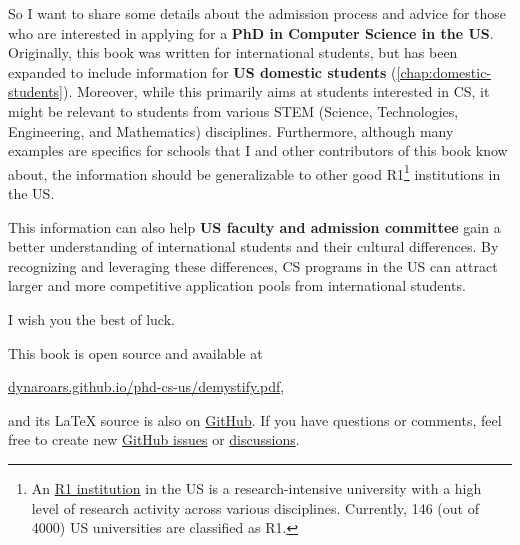 \documentclass[oneside,11pt,dvipsnames]{book}
\begin{document}
So I want to share some details about the admission process and advice for those who are interested in applying for a \textbf{PhD in Computer Science in the US}.
Originally, this book was written for international students, but has been expanded to include information for \textbf{US domestic students} (\autoref{chap:domestic-students}).
Moreover, while this primarily aims at students interested in CS, it might be relevant to students from various STEM (Science, Technologies, Engineering, and Mathematics) disciplines.
Furthermore, although many examples are specifics for schools that I and other contributors of this book know about, the information should be generalizable to other good R1\footnote{An \href{https://en.wikipedia.org/wiki/List_of_research_universities_in_the_United_States}{R1 institution} in the US is a research-intensive university with a high level of research activity across various disciplines. Currently, 146 (out of 4000) US universities are classified as R1.} institutions in the US.

This information can also help \textbf{US faculty and admission committee} gain a better understanding of international students and their cultural differences.  By recognizing and leveraging these differences, CS programs in the US can attract larger and more competitive application pools from international students.

I wish you the best of luck.

\begin{mybox}
This book is open source and available at

\begin{center}
  \href{https://dynaroars.github.io/phd-cs-us/demystify.pdf}{dynaroars.github.io/phd-cs-us/demystify.pdf},
\end{center}

\noindent and its \LaTeX{} source is also on \href{https://github.com/dynaroars/phd-cs-us}{GitHub}. If you have questions or comments, feel free to create new \href{https://github.com/dynaroars/phd-cs-us/issues}{GitHub issues} or \href{https://github.com/dynaroars/phd-cs-us/discussions}{discussions}.

\end{mybox}

\newpage
\renewcommand{\contentsname}{Contents and Summary}
\tableofcontents
\end{document}

